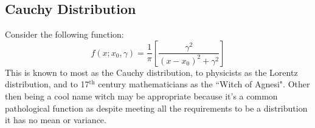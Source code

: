 \documentclass[12pt]{report}
\begin{document}

\subsection{Cauchy Distribution}
Consider the following function:
\[f(x;x_0,\gamma) = \frac{1}{\pi}\left[\frac{\gamma^2}{(x-x_0)^2+\gamma^2}\right]\]
This is known to most as the Cauchy distribution, to physicists as the Lorentz distribution, and to 17$^{\text{th}}$ century mathematicians as the ``Witch of Agnesi".
Other then being a cool name witch may be appropriate because it's a common pathological function as despite meeting all the requirements to be a distribution it has no mean or variance. 
\end{document}

